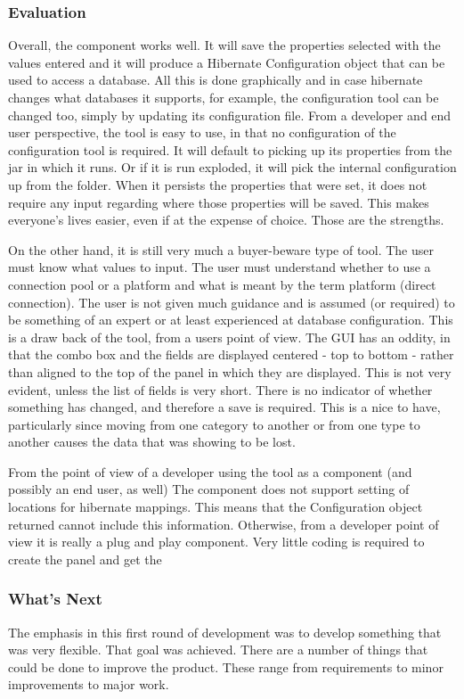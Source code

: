 \subsubsection{Evaluation}
Overall, the component works well. It will save the properties selected with the values entered and it will produce a Hibernate Configuration object that can be used to access a database. All this is done graphically and in case hibernate changes what databases it supports, for example, the configuration tool can be changed too, simply by updating its configuration file. From a developer and end user perspective, the tool is easy to use, in that no configuration of the configuration tool is required. It will default to picking up its properties from the jar in which it runs. Or if it is run exploded, it will pick the internal configuration up from the folder. When it persists the properties that were set, it does not require any input regarding where those properties will be saved. This makes everyone's lives easier, even if at the expense of choice. Those are the strengths. 

On the other hand, it is still very much a buyer-beware type of tool. The user must know what values to input. The user must understand whether to use a connection pool or a platform and what is meant by the term platform (direct connection). The user is not given much guidance and is assumed (or required) to be something of an expert or at least experienced at database configuration. This is a draw back of the tool, from a users point of view. The GUI has an oddity, in that the combo box and the fields are displayed centered - top to bottom - rather than aligned to the top of the panel in which they are displayed. This is not very evident, unless the list of fields is very short. There is no indicator of whether something has changed, and therefore a save is required. This is a nice to have, particularly since moving from one category to another or from one type to another causes the data that was showing to be lost.

From the point of view of a developer using the tool as a component (and possibly an end user, as well) The component does not support setting of locations for hibernate mappings. This means that the Configuration object returned cannot include this information. Otherwise, from a developer point of view it is really a plug and play component. Very little coding is required to create the panel and get the 


\subsubsection{What's Next}
The emphasis in this first round of development was to develop something that was very flexible. That goal was achieved. There are a number of things that could be done to improve the product. These range from requirements to minor improvements to major work.


